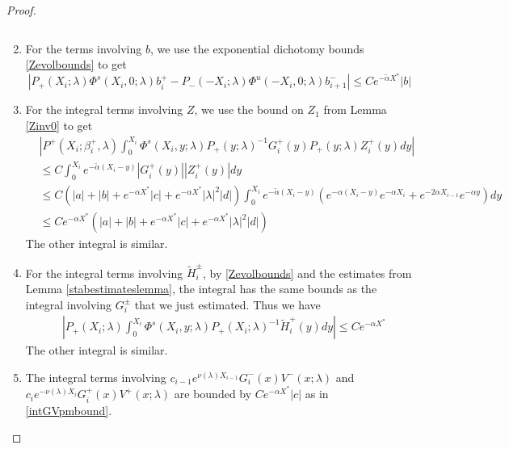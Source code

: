 \documentclass[thesis.tex]{subfiles}
\begin{document}
\begin{lemma}
\begin{proof}
\begin{enumerate}
\[\]
\item For the terms involving $b$, we use the exponential dichotomy bounds \eqref{Zevolbounds} to get
\[
| P_+(X_i; \lambda)\Phi^s(X_i, 0; \lambda) b_i^+ - P_-(-X_i; \lambda) \Phi^u(-X_i, 0; \lambda) b_{i+1}^-| \leq C e^{-\tilde{\alpha} X^*} |b|
\]
\item For the integral terms involving $Z$, we use the bound on $Z_1$ from Lemma \ref{Zinv0} to get
\begin{align*}
&\left|
P^+(X_i; \beta_i^+, \lambda) \int_0^{X_i} \Phi^s(X_i, y; \lambda) P_+(y; \lambda)^{-1} G_i^+(y) P_+(y; \lambda) Z_i^+(y) dy \right| \\
&\leq C \int_0^{X_i} e^{-\tilde{\alpha}(X_i - y)} |G_i^+(y)| |Z_i^+(y)| dy \\
&\leq C \left(|a| + |b| + e^{-\alpha X^*} |c| + e^{-\alpha X^*}|\lambda|^2|d|\right) \int_0^{X_i} e^{-\tilde{\alpha}(X_i - y)} \left(e^{-\alpha(X_i - y)}e^{-\alpha X_i} + e^{-2 \alpha X_{i-1}} e^{-\alpha y} \right) dy \\
&\leq C e^{-\alpha X^*} \left(|a| + |b| + e^{-\alpha X^*} |c| + e^{-\alpha X^*}|\lambda|^2|d|\right)
\end{align*}
The other integral is similar.

\item For the integral terms involving $\tilde{H}_i^\pm$, by \eqref{Zevolbounds} and the estimates from Lemma \ref{stabestimateslemma}, the integral has the same bounds as the integral involving $G_i^\pm$ that we just estimated. Thus we have
\begin{align*}
&\left|
P_+(X_i; \lambda) \int_0^{X_i} \Phi^s(X_i, y; \lambda) P_+(X_i; \lambda)^{-1} \tilde{H}_i^+(y) dy \right| \leq C e^{-\alpha X^*} 
\end{align*}
The other integral is similar.

\item The integral terms involving $c_{i-1} e^{\nu(\lambda) X_{i-1}} G_i^-(x) V^-(x; \lambda)$ and $c_i e^{-\nu(\lambda) X_i} G_i^+(x) V^+(x; \lambda)$ are bounded by $C e^{-\alpha X^*} |c|$ as in \cref{intGVpmbound}. 
\end{enumerate}


\end{proof}
\end{lemma}
\end{document}
